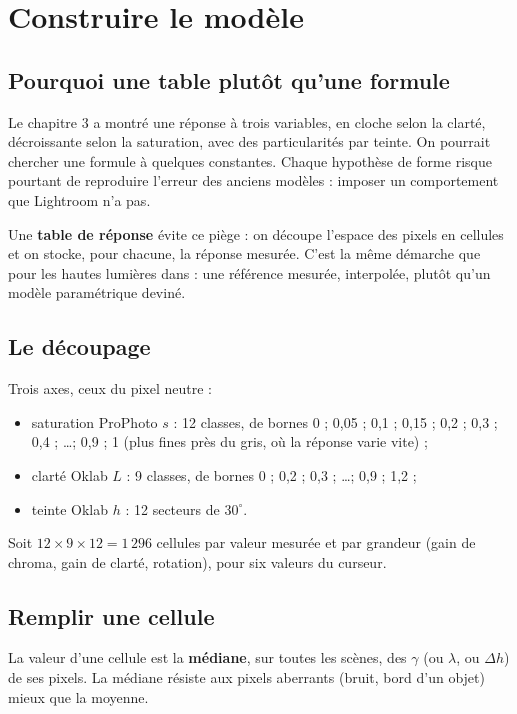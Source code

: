 \chapter{Construire le modèle}

\section{Pourquoi une table plutôt qu'une formule}
Le chapitre 3 a montré une réponse à trois variables, en cloche selon la
clarté, décroissante selon la saturation, avec des particularités par teinte.
On pourrait chercher une formule à quelques constantes. Chaque hypothèse de
forme risque pourtant de reproduire l'erreur des anciens modèles : imposer un
comportement que Lightroom n'a pas.

Une \textbf{table de réponse} évite ce piège : on découpe l'espace des pixels
en cellules et on stocke, pour chacune, la réponse mesurée. C'est la même
démarche que pour les hautes lumières dans \IPR{} : une référence mesurée,
interpolée, plutôt qu'un modèle paramétrique deviné.

\section{Le découpage}
Trois axes, ceux du pixel neutre :
\begin{itemize}
\item saturation ProPhoto $s$ : 12 classes, de bornes
0 ; 0,05 ; 0,1 ; 0,15 ; 0,2 ; 0,3 ; 0,4 ; \ldots ; 0,9 ; 1 (plus fines près du
gris, où la réponse varie vite) ;
\item clarté Oklab $L$ : 9 classes, de bornes 0 ; 0,2 ; 0,3 ; \ldots ; 0,9 ; 1,2 ;
\item teinte Oklab $h$ : 12 secteurs de $30^\circ$.
\end{itemize}
Soit $12\times9\times12=1\,296$ cellules par valeur mesurée et par grandeur
(gain de chroma, gain de clarté, rotation), pour six valeurs du curseur.

\section{Remplir une cellule}
La valeur d'une cellule est la \textbf{médiane}, sur toutes les scènes, des
$\gamma$ (ou $\lambda$, ou $\Delta h$) de ses pixels. La médiane résiste aux
pixels aberrants (bruit, bord d'un objet) mieux que la moyenne.

